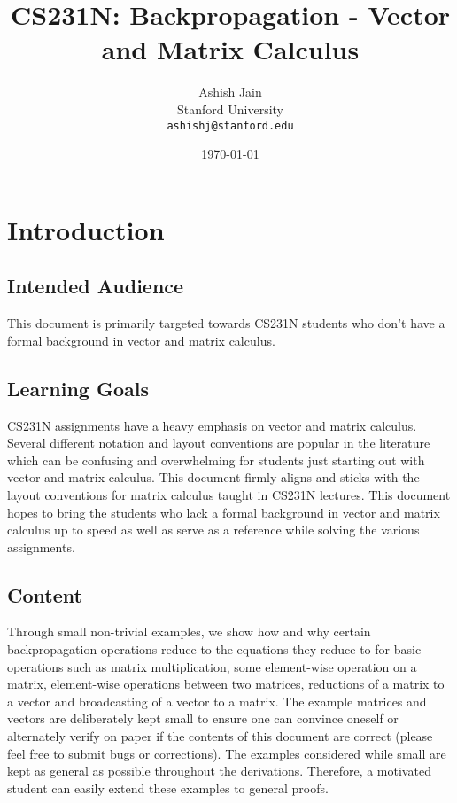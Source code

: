\documentclass{article}
\title{CS231N: Backpropagation - Vector and Matrix Calculus}
\author{
  Ashish Jain \\
  Stanford University \\
  \texttt{ashishj@stanford.edu}
 }
\date{\today}
\begin{document}
\pagestyle{empty}
\maketitle

\tableofcontents

\newpage
\pagestyle{fancy}
\section{Introduction}
\subsection{Intended Audience}
This document is primarily targeted towards CS231N students who don't have a formal background in vector and matrix calculus.

\subsection{Learning Goals}
CS231N assignments have a heavy emphasis on vector and matrix calculus. Several different notation and layout conventions are popular in the literature which can be confusing and overwhelming for students just starting out with vector and matrix calculus. This document firmly aligns and sticks with the layout conventions for matrix calculus taught in CS231N lectures. This document hopes to bring the students who lack a formal background in vector and matrix calculus up to speed as well as serve as a reference while solving the various assignments. 

\subsection{Content}
Through small non-trivial examples, we show how and why certain backpropagation operations reduce to the equations they reduce to for basic operations such as matrix multiplication, some element-wise operation on a matrix, element-wise operations between two matrices, reductions of a matrix to a vector and broadcasting of a vector to a matrix. The example matrices and vectors are deliberately kept small to ensure one can convince oneself or alternately verify on paper if the contents of this document are correct (please feel free to submit bugs or corrections). The examples considered while small are kept as general as possible throughout the derivations. Therefore, a motivated student can easily extend these examples to general proofs.
\end{document}
